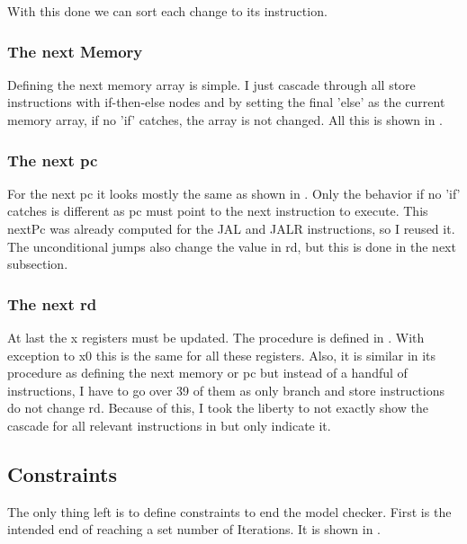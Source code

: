 With this done we can sort each change to its instruction.



\subsubsection{The next Memory}
Defining the next memory array is simple. I just cascade through all
store instructions with if-then-else nodes and by setting the final
'else' as the current memory array, if no 'if' catches, the array is
not changed. All this is shown in .



\subsubsection{The next pc}
For the next pc it looks mostly the same as shown in
. Only the behavior if no 'if' catches is
different as pc must point to the next instruction to execute. This
nextPc was already computed for the JAL and JALR instructions, so I
reused it. The unconditional jumps also change the value in rd, but
this is done in the next subsection.



\subsubsection{The next rd}
At last the x registers must be updated. The procedure is defined in
. With exception to x0 this is the same for all
these registers. Also, it is similar in its procedure as defining the
next memory or pc but instead of a handful of instructions, I have to
go over 39 of them as only branch and store instructions do not
change rd. Because of this, I took the liberty to not exactly show
the cascade for all relevant instructions in  but
only indicate it.



\subsection{Constraints}
The only thing left is to define constraints to end the model
checker. First is the intended end of reaching a set number of
Iterations. It is shown in .

